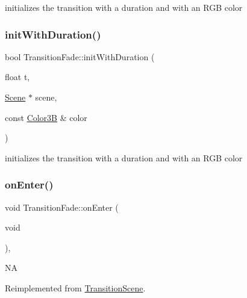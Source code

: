 initializes the transition with a duration and with an R\+GB color \mbox{\label{classTransitionFade_ac2caf085c6ebb62005f7c87a15f0920f}} 
\subsubsection{\texorpdfstring{init\+With\+Duration()}{initWithDuration()}\hspace{0.1cm}{\footnotesize\ttfamily [2/2]}}
{\footnotesize\ttfamily bool Transition\+Fade\+::init\+With\+Duration (\begin{DoxyParamCaption}\item[{float}]{t,  }\item[{\hyperlink{classScene}{Scene} $\ast$}]{scene,  }\item[{const \hyperlink{structColor3B}{Color3B} \&}]{color }\end{DoxyParamCaption})}

initializes the transition with a duration and with an R\+GB color \mbox{\label{classTransitionFade_aaeb601022c4d71c24e333fe1807f88d4}} 
\subsubsection{\texorpdfstring{on\+Enter()}{onEnter()}\hspace{0.1cm}{\footnotesize\ttfamily [1/2]}}
{\footnotesize\ttfamily void Transition\+Fade\+::on\+Enter (\begin{DoxyParamCaption}\item[{void}]{ }\end{DoxyParamCaption})\hspace{0.3cm}{\ttfamily [override]}, {\ttfamily [virtual]}}

NA 

Reimplemented from \hyperlink{classTransitionScene_aace390a1bd8f3c73bb650a1e256a0f83}{Transition\+Scene}.

\mbox{\label{classTransitionFade_a2fadd05a4c0d74b34b1530c7d7f07255}} 
